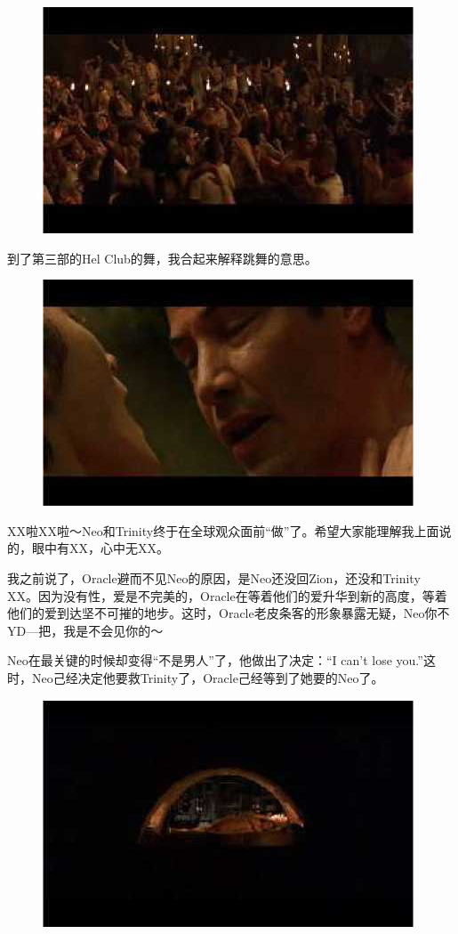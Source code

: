 \documentclass[UTF8]{ctexart}
\begin{document}
\begin{figure}[htb]
\centering
\includegraphics[width=0.5\linewidth]{fig/read_reloaded-43}
\end{figure}

到了第三部的Hel Club的舞，我合起来解释跳舞的意思。

\begin{figure}[htb]
\centering
\includegraphics[width=0.5\linewidth]{fig/read_reloaded-44}
\end{figure}

XX啦XX啦～Neo和Trinity终于在全球观众面前“做”了。希望大家能理解我上面说的，眼中有XX，心中无XX。

我之前说了，Oracle避而不见Neo的原因，是Neo还没回Zion，还没和Trinity XX。因为没有性，爱是不完美的，Oracle在等着他们的爱升华到新的高度，等着他们的爱到达坚不可摧的地步。这时，Oracle老皮条客的形象暴露无疑，Neo你不YD—把，我是不会见你的～

Neo在最关键的时候却变得“不是男人”了，他做出了决定：“I can't lose you.”这时，Neo己经决定他要救Trinity了，Oracle己经等到了她要的Neo了。

\begin{figure}[htb]
\centering
\includegraphics[width=0.5\linewidth]{fig/read_reloaded-46}
\end{figure}
\end{document}
